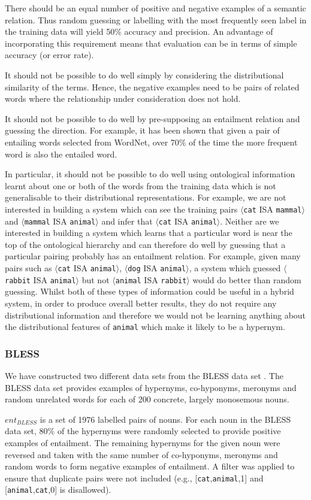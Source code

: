 \documentclass[11pt]{article}
\newcommand\pair[2]{$\langle$\texttt{#1} ISA \texttt{#2}$\rangle$}
\begin{document}
There should be an equal number of positive and negative examples of a semantic relation.  Thus random guessing or labelling with the most frequently seen label in the training data will yield 50\% accuracy and precision.  An advantage of incorporating this requirement means that evaluation can be in terms of simple accuracy (or error rate).

It should not be possible to do well simply by considering the distributional similarity of the terms.  Hence, the negative examples need to be pairs of related words where the relationship under consideration does not hold.

It should not be possible to do well by pre-supposing an entailment relation and guessing the direction.  For example, it has been shown \cite{Weeds2004} that given a pair of entailing words selected from WordNet, over 70\% of the time the more frequent word is also the entailed word.

In particular, it should not be possible to do well using ontological information learnt about one or both of the words from the training data which is not generalisable to their distributional representations.  For example, we are not interested in building a system which can see the training pairs \pair{cat}{mammal} and \pair{mammal}{animal} and infer that \pair{cat}{animal}.  Neither are we interested in building a system which learns that a particular word is near the top of the ontological hierarchy and can therefore do well by guessing that a particular pairing probably has an entailment relation.  For example, given many pairs such as \pair{cat}{animal}, \pair{dog}{animal}, a system which guessed \pair{rabbit}{animal} but not \pair{animal}{rabbit} would do better than random guessing.  Whilst both of these types of information could be useful in a hybrid system, in order to produce overall better results, they do not require any distributional information and therefore we would not be learning anything about the distributional features of \texttt{animal} which make it likely to be a hypernym.

\subsubsection{BLESS}
We have constructed two different data sets from the BLESS data set \cite{Baroni2011}.  The BLESS data set provides examples of hypernyms, co-hyponyms, meronyms and random unrelated words for each of 200 concrete, largely monosemous nouns.

$ent_{BLESS}$ is a set of 1976 labelled pairs of nouns.  For each noun in the BLESS data set, 80\% of the hypernyms were randomly selected to provide positive examples of entailment.  The remaining hypernyms for the given noun were reversed and taken with the same number of co-hyponyms, meronyms and random words to form negative examples of entailment.  A filter was applied to ensure that duplicate pairs were not included (e.g., [\texttt{cat},\texttt{animal},1] and [\texttt{animal},\texttt{cat},0] is disallowed). 
\end{document}
